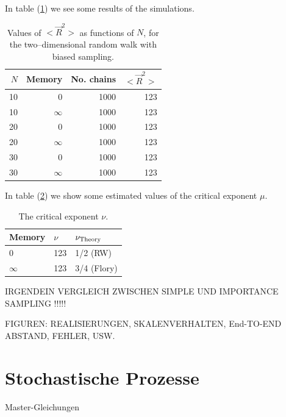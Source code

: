 In table (\ref{T_SAW}) we see some results of the simulations.
\begin{table}
\label{T_SAW}
\caption{Values of $<\vec{R}^2>$ as functions of $N$, 
for the two--dimensional random walk with biased sampling.}
\begin{center}
\begin{tabular}{rrrr} \hline \hline
$N$ & Memory & No. chains & $<\vec{R}^2>$ \\ \hline
10  & 0        & 1000     &    123 \\
10  & $\infty$ & 1000     & 123 \\
20  & 0        & 1000     & 123   \\
20  & $\infty$ & 1000     & 123 \\
30  & 0        & 1000     & 123 \\ 
30  & $\infty$ & 1000     & 123 \\ \hline \hline
\end{tabular}
\end{center}
\end{table}


In table (\ref{T_SAW_NU}) we show some estimated values of 
the critical exponent $\mu$.
\begin{table}
\label{T_SAW_NU}
\caption{The critical exponent $\nu$.}
\begin{center}
\begin{tabular}{lll}\hline \hline
Memory   & $\nu$ & $\nu_{\rm Theory}$ \\ \hline
0        & 123   & 1/2 (RW)  \\
$\infty$ & 123   & 3/4 (Flory) \\
\hline \hline
\end{tabular}
\end{center}
\end{table}

IRGENDEIN VERGLEICH ZWISCHEN SIMPLE UND IMPORTANCE SAMPLING !!!!!


FIGUREN: REALISIERUNGEN, SKALENVERHALTEN, End-TO-END ABSTAND,
FEHLER, USW.


\chapter{Stochastische Prozesse}
Master-Gleichungen

